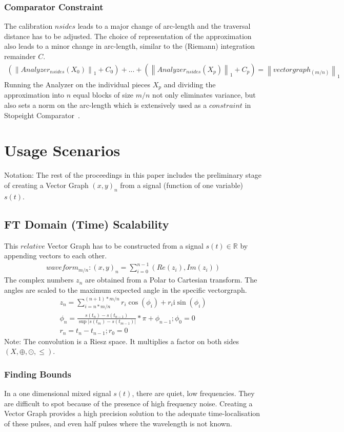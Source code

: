 \documentclass{report}
\newcommand\norm[1]{\left\lVert#1\right\rVert}
\begin{document}
\subsection{Comparator Constraint}
The calibration $nsides$ leads to a major change of arc-length and the traversal distance has to be adjusted. The choice of representation of the approximation also leads to a minor change in arc-length, similar to the (Riemann) integration remainder $C$.
\begin{align}
(\norm{Analyzer_{nsides}(X_{0})}_{1}+C_{0})+...+(\norm{Analyzer_{nsides}(X_{p})}_{1}+C_{p})=\norm{vectorgraph_{(m/n)}}_1
\end{align}
Running the Analyzer on the individual pieces $X_{p}$ and dividing the approximation into $n$ equal blocks of size $m/n$ not only eliminates variance, but also sets a norm on the arc-length which is extensively used as a $constraint$ in Stopeight Comparator~\cite{Analyzer}.

\chapter{Usage Scenarios}
Notation: The rest of the proceedings in this paper includes the preliminary stage of creating a Vector Graph $(x,y)_{n}$ from a signal (function of one variable) $s(t)$.
\section{FT Domain (Time) Scalability}
This $relative$ Vector Graph has to be constructed from a signal $s(t)\in \mathbb{R}$ by appending vectors to each other.
\begin{align}
waveform_{m/n}: (x,y)_{n}=\sum \limits _{i=0}^{n-1}(Re(z_{i}),Im(z_{i}))
\end{align}
The complex numbers $z_{n}$ are obtained from a Polar to Cartesian transform. The angles are scaled to the maximum expected angle in the specific vectorgraph.
\begin{align}
z_{n}=\sum \limits _{i=n*m/n}^{(n+1)*m/n}r_{i}\cos(\phi_{i})+r_{i}\mathrm{i}\sin(\phi_{i})\\
\phi_{n}=\frac{s(t_{n})-s(t_{n-1})}{\sup \lvert s(t_{m})-s(t_{m-1}) \rvert}*\pi+\phi_{n-1};\phi_{0}=0\\
r_{n}=t_{n}-t_{n-1};r_{0}=0
\end{align}
Note: The convolution is a Riesz space. It multiplies a factor on both sides $(X,\oplus,\odot,\leq)$.
\subsection{Finding Bounds}
In a one dimensional mixed signal $s(t)$, there are quiet, low frequencies. They are difficult to spot because of the presence of high frequency noise. Creating a Vector Graph provides a high precision solution to the adequate time-localisation of these pulses, and even half pulses where the wavelength is not known.
\end{document}
